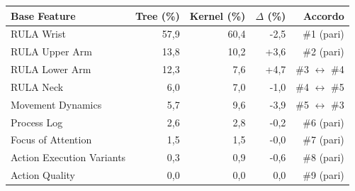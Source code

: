 \begin{tabular*}{\linewidth}{@{}l@{\extracolsep{\fill}}rrrr@{}}
\toprule
\textbf{Base Feature} & \textbf{Tree (\%)} & \textbf{Kernel (\%)} & \textbf{$\Delta$ (\%)} & \textbf{Accordo} \\
\midrule
RULA Wrist & 57{,}9 & 60{,}4 & -2{,}5 & \#1 (pari) \\
RULA Upper Arm & 13{,}8 & 10{,}2 & +3{,}6 & \#2 (pari) \\
RULA Lower Arm & 12{,}3 & 7{,}6 & +4{,}7 & \#3 $\leftrightarrow$ \#4 \\
RULA Neck & 6{,}0 & 7{,}0 & -1{,}0 & \#4 $\leftrightarrow$ \#5 \\
Movement Dynamics & 5{,}7 & 9{,}6 & -3{,}9 & \#5 $\leftrightarrow$ \#3 \\
Process Log & 2{,}6 & 2{,}8 & -0{,}2 & \#6 (pari) \\
Focus of Attention & 1{,}5 & 1{,}5 & -0{,}0 & \#7 (pari) \\
Action Execution Variants & 0{,}3 & 0{,}9 & -0{,}6 & \#8 (pari) \\
Action Quality & 0{,}0 & 0{,}0 & 0{,}0 & \#9 (pari) \\
\bottomrule
\end{tabular*}
